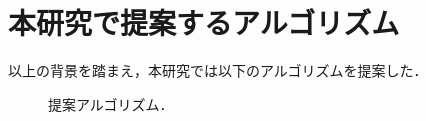 \documentclass[papersize]{suribtabst}
\begin{document}
\clearpage

\section{本研究で提案するアルゴリズム}

以上の背景を踏まえ，本研究では以下のアルゴリズムを提案した．

\begin{figure}[htbp]
\centering
\fbox{\rule{0cm}{3cm}\rule{5cm}{0cm}}
\caption{提案アルゴリズム．}
\end{figure}





\begin{thebibliography}{99} %
\end{thebibliography}
\end{document}
